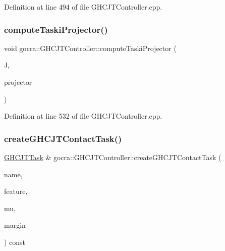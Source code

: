 Definition at line 494 of file G\+H\+C\+J\+T\+Controller.\+cpp.

\hypertarget{classgocra_1_1GHCJTController_a7c544e46be7f415675f68f3c4fe6be93}{}\label{classgocra_1_1GHCJTController_a7c544e46be7f415675f68f3c4fe6be93} 
\subsubsection{\texorpdfstring{compute\+Taski\+Projector()}{computeTaskiProjector()}}
{\footnotesize\ttfamily void gocra\+::\+G\+H\+C\+J\+T\+Controller\+::compute\+Taski\+Projector (\begin{DoxyParamCaption}\item[{const Eigen\+::\+Matrix\+Xd \&}]{J,  }\item[{Eigen\+::\+Matrix\+Xd \&}]{projector }\end{DoxyParamCaption})}



Definition at line 532 of file G\+H\+C\+J\+T\+Controller.\+cpp.

\hypertarget{classgocra_1_1GHCJTController_aefa4677e1ee240157074bfc166d030c1}{}\label{classgocra_1_1GHCJTController_aefa4677e1ee240157074bfc166d030c1} 
\subsubsection{\texorpdfstring{create\+G\+H\+C\+J\+T\+Contact\+Task()}{createGHCJTContactTask()}}
{\footnotesize\ttfamily \hyperlink{classgocra_1_1GHCJTTask}{G\+H\+C\+J\+T\+Task} \& gocra\+::\+G\+H\+C\+J\+T\+Controller\+::create\+G\+H\+C\+J\+T\+Contact\+Task (\begin{DoxyParamCaption}\item[{const std\+::string \&}]{name,  }\item[{Point\+Contact\+Feature\+::\+Ptr}]{feature,  }\item[{double}]{mu,  }\item[{double}]{margin }\end{DoxyParamCaption}) const}



